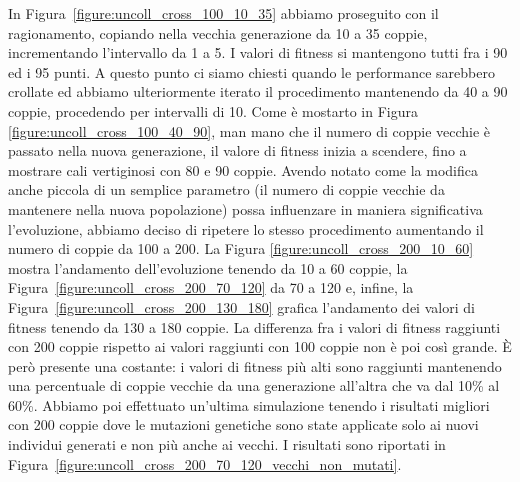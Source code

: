 In Figura~\ref{figure:uncoll_cross_100_10_35} abbiamo proseguito con il
ragionamento, copiando nella vecchia generazione da 10 a 35 coppie,
incrementando l'intervallo da 1 a 5. I valori di fitness si mantengono tutti fra
i 90 ed i 95 punti.\newline
A questo punto ci siamo chiesti quando le performance sarebbero crollate ed
abbiamo ulteriormente iterato il procedimento mantenendo da 40 a 90 coppie,
procedendo per intervalli di 10. Come è mostarto in Figura
\ref{figure:uncoll_cross_100_40_90}, man mano che il numero di coppie vecchie è
passato nella nuova generazione, il valore di fitness inizia a scendere, fino
a mostrare cali vertiginosi con 80 e 90 coppie.\newline
Avendo notato come la modifica anche piccola di un semplice parametro (il numero
di coppie vecchie da mantenere nella nuova popolazione) possa influenzare in
maniera significativa l'evoluzione, abbiamo deciso di ripetere lo stesso
procedimento aumentando il numero di coppie da 100 a 200. La Figura
\ref{figure:uncoll_cross_200_10_60} mostra l'andamento dell'evoluzione tenendo
da 10 a 60 coppie, la Figura~\ref{figure:uncoll_cross_200_70_120} da 70 a 120 e,
infine, la Figura~\ref{figure:uncoll_cross_200_130_180} grafica l'andamento dei
valori di fitness tenendo da 130 a 180 coppie.\newline
La differenza fra i valori di fitness raggiunti con 200 coppie rispetto ai
valori raggiunti con 100 coppie non è poi così grande. È però presente una
costante: i valori di fitness più alti sono raggiunti mantenendo una percentuale
di coppie vecchie da una generazione all'altra che va dal 10\% al 60\%.\newline
Abbiamo poi effettuato un'ultima simulazione tenendo i risultati migliori con
200 coppie dove le mutazioni genetiche sono state applicate solo ai nuovi
individui generati e non più anche ai vecchi. I risultati sono riportati in
Figura~\ref{figure:uncoll_cross_200_70_120_vecchi_non_mutati}.
